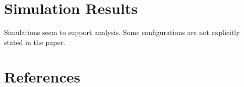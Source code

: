 \documentclass[conference]{IEEEtran}
\begin{document}
\section{Simulation Results}
Simulations seem to support analysis.
Some configurations are not explicitly stated in the paper.

\begin{figure}
\resizebox{\columnwidth}{!}{}
\end{figure}
\section*{References}


%
%
\end{document}
